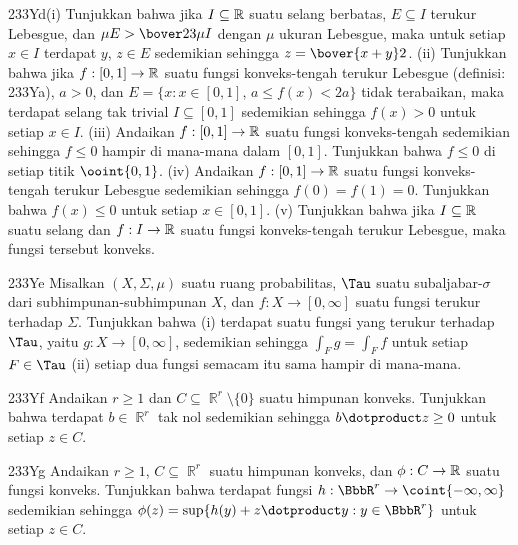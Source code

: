 {\spheader 233Yd(i) Tunjukkan bahwa jika $I\subseteq\Bbb R$ suatu selang
berbatas, $E\subseteq I$ terukur Lebesgue, dan
$\mu E>\bover23\mu I$ dengan $\mu$ ukuran Lebesgue, maka untuk setiap
$x\in I$ terdapat $y$, $z\in E$ sedemikian sehingga
$z=\bover{x+y}2$.  (ii) Tunjukkan bahwa jika
$f:[0,1]\to\Bbb R$ suatu fungsi konveks-tengah terukur Lebesgue
(definisi: 233Ya), $a>0$, dan
$E=\{x:x\in[0,1]$, $a\le f(x)<2a\}$ tidak terabaikan, maka terdapat
selang tak trivial $I\subseteq[0,1]$ sedemikian sehingga $f(x)>0$ untuk
setiap $x\in I$.  (iii) Andaikan
$f:[0,1]\to\Bbb R$ suatu fungsi konveks-tengah sedemikian sehingga
$f\le 0$ hampir di mana-mana dalam $[0,1]$. Tunjukkan bahwa $f\le 0$ di
setiap titik $\ooint{0,1}$. 
(iv) Andaikan $f:[0,1]\to\Bbb R$ suatu fungsi konveks-tengah terukur
Lebesgue sedemikian sehingga $f(0)=f(1)=0$. Tunjukkan bahwa $f(x)\le 0$
untuk setiap $x\in[0,1]$.
(v) Tunjukkan bahwa jika $I\subseteq\Bbb R$ suatu selang dan
$f:I\to\Bbb R$ suatu fungsi konveks-tengah terukur Lebesgue, maka fungsi
tersebut konveks.

\spheader 233Ye Misalkan $(X,\Sigma,\mu)$ suatu ruang probabilitas,
$\Tau$ suatu subaljabar-$\sigma$ dari subhimpunan-subhimpunan $X$, dan
$f:X\to[0,\infty]$ suatu fungsi terukur terhadap $\Sigma$. Tunjukkan
bahwa (i) terdapat suatu fungsi yang terukur terhadap $\Tau$, yaitu
$g:X\to[0,\infty]$, sedemikian sehingga $\int_Fg=\int_Ff$ untuk setiap
$F\in\Tau$
(ii) setiap dua fungsi semacam itu sama hampir di mana-mana.

\spheader 233Yf Andaikan $r\ge 1$ dan
$C\subseteq\BbbR^r\setminus\{0\}$ suatu himpunan konveks. Tunjukkan
bahwa terdapat $b\in\BbbR^r$ tak nol sedemikian sehingga
$\varinnerprod{b}{z}\ge 0$ untuk setiap $z\in C$.

\spheader 233Yg Andaikan $r\ge 1$, $C\subseteq\BbbR^r$ suatu himpunan
konveks, dan $\phi:C\to\Bbb R$ suatu fungsi konveks. Tunjukkan bahwa
terdapat fungsi $h:\BbbR^r\to\coint{-\infty,\infty}$ sedemikian sehingga
$\phi(z)=\sup\{h(y)+\varinnerprod{z}{y}:y\in\BbbR^r\}$ untuk setiap
$z\in C$.

}
